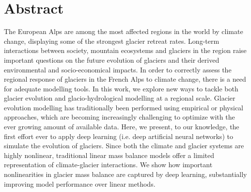 
\section*{Abstract}

The European Alps are among the most affected regions in the world by climate change, displaying some of the strongest glacier retreat rates. Long-term interactions between society, mountain ecosystems and glaciers in the region raise important questions on the future evolution of glaciers and their derived environmental and socio-economical impacts. In order to correctly assess the regional response of glaciers in the French Alps to climate change, there is a need for adequate modelling tools. In this work, we explore new ways to tackle both glacier evolution and glacio-hydrological modelling at a regional scale. Glacier evolution modelling has traditionally been performed using empirical or physical approaches, which are becoming increasingly challenging to optimize with the ever growing amount of available data. Here, we present, to our knowledge, the first effort ever to apply deep learning (i.e. deep artificial neural networks) to simulate the evolution of glaciers. Since both the climate and glacier systems are highly nonlinear, traditional linear mass balance models offer a limited representation of climate-glacier interactions. We show how important nonlinearities in glacier mass balance are captured by deep learning, substantially improving model performance over linear methods. 

